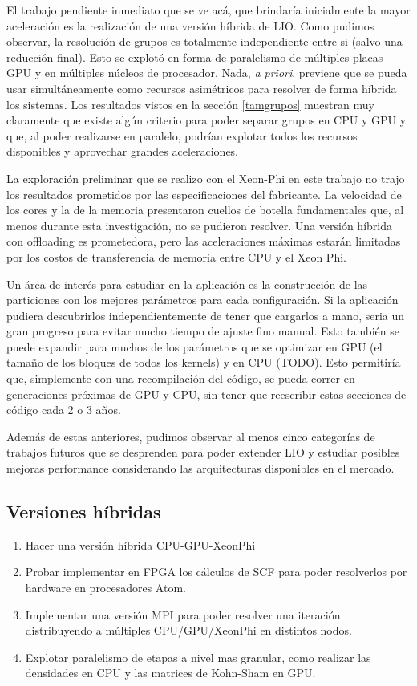 El trabajo pendiente inmediato que se ve ac\'a, que brindar\'ia inicialmente la mayor aceleraci\'on
es la realizaci\'on de una versi\'on h\'ibrida de LIO. Como pudimos observar, la resoluci\'on de grupos es
totalmente independiente entre si (salvo una reducci\'on final). Esto se explot\'o en forma de paralelismo
de m\'ultiples placas GPU y en m\'ultiples n\'ucleos de procesador. Nada, \textit{a priori}, previene
que se pueda usar simult\'aneamente como recursos asim\'etricos para resolver de forma h\'ibrida los sistemas.
Los resultados vistos en la secci\'on \ref{tamgrupos} muestran muy claramente que existe alg\'un criterio
para poder separar grupos en CPU y GPU y que, al poder realizarse en paralelo, podr\'ian explotar
todos los recursos disponibles y aprovechar grandes aceleraciones.

La exploraci\'on preliminar que se realizo con el Xeon-Phi en este trabajo no trajo los resultados
prometidos por las especificaciones del fabricante. La velocidad de los cores y la de la memoria
presentaron cuellos de botella fundamentales que, al menos durante esta investigaci\'on, no se
pudieron resolver. Una versi\'on h\'ibrida con offloading es prometedora, pero las aceleraciones m\'aximas
estar\'an limitadas por los costos de transferencia de memoria entre CPU y el Xeon Phi.

Un \'area de inter\'es para estudiar en la aplicaci\'on es la construcci\'on de las particiones
con los mejores par\'ametros para cada configuraci\'on. Si la aplicaci\'on pudiera descubrirlos
independientemente de tener que cargarlos a mano, seria un gran progreso para evitar mucho
tiempo de ajuste fino manual. Esto tambi\'en se puede expandir para muchos de los par\'ametros
que se optimizar en GPU (el tama\~no de los bloques de todos los kernels) y en CPU (TODO).
Esto permitir\'ia que, simplemente con una recompilaci\'on del c\'odigo, se pueda correr en generaciones
pr\'oximas de GPU y CPU, sin tener que reescribir estas secciones de c\'odigo cada 2 o 3 a\~nos.

Adem\'as de estas anteriores, pudimos observar al menos cinco categor\'ias de trabajos futuros que se
desprenden para poder extender LIO y estudiar posibles mejoras performance considerando
las arquitecturas disponibles en el mercado.
\subsection{Versiones h\'ibridas}
\begin{enumerate}
 \item Hacer una versi\'on h\'ibrida CPU-GPU-XeonPhi
  \item Probar implementar en FPGA los c\'alculos de SCF para poder resolverlos por hardware en procesadores
    Atom.
  \item Implementar una versi\'on MPI para poder resolver una iteraci\'on distribuyendo
    a m\'ultiples CPU/GPU/XeonPhi en distintos nodos.
  \item Explotar paralelismo de etapas a nivel mas granular, como realizar las densidades en CPU y las matrices
    de Kohn-Sham en GPU.
\end{enumerate}

